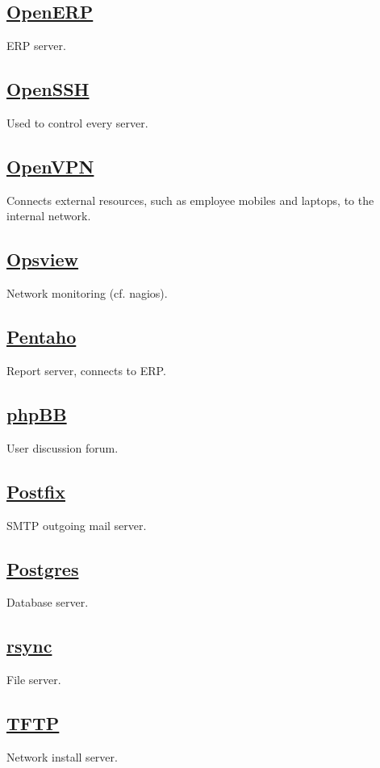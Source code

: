 \subsection{\href{http://www.openerp.org/}{OpenERP}}
ERP server.

\subsection{\href{http://www.openssh.com/}{OpenSSH}}
Used to control every server.

\subsection{\href{http://openvpn.net/}{OpenVPN}}
Connects external resources, such as employee mobiles and laptops, to the internal network.

\subsection{\href{http://www.opsview.com/}{Opsview}}
Network monitoring (cf. nagios).

\subsection{\href{http://community.pentaho.com/}{Pentaho}}
Report server, connects to ERP.

\subsection{\href{https://www.phpbb.com/}{phpBB}}
User discussion forum.

\subsection{\href{http://www.postfix.org/}{Postfix}}
SMTP outgoing mail server.

\subsection{\href{http://www.postgresql.org/}{Postgres}}
Database server.

\subsection{\href{http://rsync.samba.org/}{rsync}}
File server.

\subsection{\href{http://dnsmasq.org/}{TFTP}}
Network install server.

